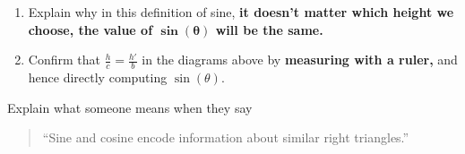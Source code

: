 \documentclass[noauthor,nooutcomes,hints,handout,12pt]{ximera}
\begin{document}
\begin{question}
\begin{enumerate}
\begin{center}
      \end{center}
      
     \item       
       Explain why in this definition of sine, \textbf{it doesn't matter which
         height we choose, the value of $\boldsymbol{\sin(\theta)}$ will be the same.}

     \item Confirm that $\frac{h}{c} = \frac{h'}{b}$ in the diagrams
       above by \textbf{measuring with a ruler,} and hence directly computing
       $\sin(\theta)$.
        \end{enumerate}
\end{question}

\mynewpage

\begin{question}
  Explain what someone means when they say
  \begin{quote}
    ``Sine and cosine encode information about similar right
    triangles.''
  \end{quote}
\end{question}
\end{document}
